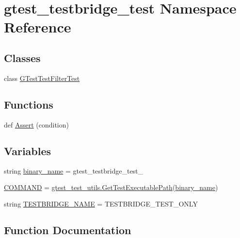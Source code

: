\hypertarget{namespacegtest__testbridge__test}{}\section{gtest\+\_\+testbridge\+\_\+test Namespace Reference}
\label{namespacegtest__testbridge__test}
\subsection*{Classes}
\begin{DoxyCompactItemize}
\item 
class \mbox{\hyperlink{classgtest__testbridge__test_1_1_g_test_test_filter_test}{G\+Test\+Test\+Filter\+Test}}
\end{DoxyCompactItemize}
\subsection*{Functions}
\begin{DoxyCompactItemize}
\item 
def \mbox{\hyperlink{namespacegtest__testbridge__test_a4cadaae26d75cafe8979fb17059b928e}{Assert}} (condition)
\end{DoxyCompactItemize}
\subsection*{Variables}
\begin{DoxyCompactItemize}
\item 
string \mbox{\hyperlink{namespacegtest__testbridge__test_a977d1efd7bcefffc40c3180756a22b54}{binary\+\_\+name}} = \textquotesingle{}gtest\+\_\+testbridge\+\_\+test\+\_\+\textquotesingle{}
\item 
\mbox{\hyperlink{namespacegtest__testbridge__test_a877e21091a8b1b2c70f8741279592c4a}{C\+O\+M\+M\+A\+ND}} = \mbox{\hyperlink{namespacegtest__test__utils_a89ed3717984a80ffbb7a9c92f71b86a2}{gtest\+\_\+test\+\_\+utils.\+Get\+Test\+Executable\+Path}}(\mbox{\hyperlink{namespacegtest__testbridge__test_a977d1efd7bcefffc40c3180756a22b54}{binary\+\_\+name}})
\item 
string \mbox{\hyperlink{namespacegtest__testbridge__test_a33605c2f318125cd970d016043c05d8f}{T\+E\+S\+T\+B\+R\+I\+D\+G\+E\+\_\+\+N\+A\+ME}} = \textquotesingle{}T\+E\+S\+T\+B\+R\+I\+D\+G\+E\+\_\+\+T\+E\+S\+T\+\_\+\+O\+N\+LY\textquotesingle{}
\end{DoxyCompactItemize}


\subsection{Function Documentation}
\mbox{\label{namespacegtest__testbridge__test_a4cadaae26d75cafe8979fb17059b928e}} 
